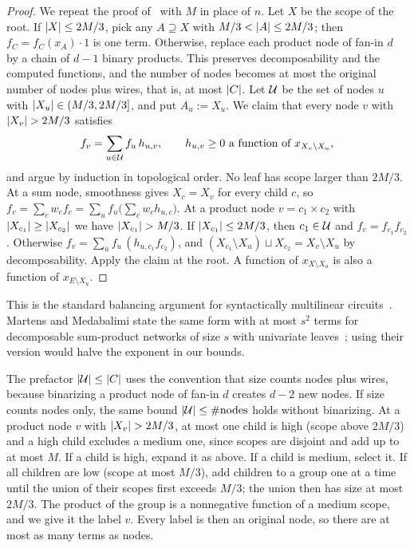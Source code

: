 \begin{proof}
We repeat the proof of~\cite{Blaschke26Dimers} with $M$ in place of $n$. Let $X$ be the scope of the root. If $\lvert X\rvert\le2M/3$, pick any $A\supseteq X$ with $M/3<\lvert A\rvert\le2M/3$; then $f_C=f_C(x_A)\cdot1$ is one term. Otherwise, replace each product node of fan-in $d$ by a chain of $d-1$ binary products. This preserves decomposability and the computed functions, and the number of nodes becomes at most the original number of nodes plus wires, that is, at most $\lvert C\rvert$. Let $\mathcal{U}$ be the set of nodes $u$ with $\lvert X_u\rvert\in(M/3,2M/3]$, and put $A_u:=X_u$. We claim that every node $v$ with $\lvert X_v\rvert>2M/3$ satisfies
\[
  f_v=\sum_{u\in\mathcal{U}}f_u\,h_{u,v},\qquad h_{u,v}\ge0\ \text{a function of }x_{X_v\setminus X_u},
\]
and argue by induction in topological order. No leaf has scope larger than $2M/3$. At a sum node, smoothness gives $X_c=X_v$ for every child $c$, so $f_v=\sum_cw_cf_c=\sum_uf_u\bigl(\sum_cw_ch_{u,c}\bigr)$. At a product node $v=c_1\times c_2$ with $\lvert X_{c_1}\rvert\ge\lvert X_{c_2}\rvert$ we have $\lvert X_{c_1}\rvert>M/3$. If $\lvert X_{c_1}\rvert\le2M/3$, then $c_1\in\mathcal{U}$ and $f_v=f_{c_1}f_{c_2}$. Otherwise $f_v=\sum_uf_u\,(h_{u,c_1}f_{c_2})$, and $(X_{c_1}\setminus X_u)\sqcup X_{c_2}=X_v\setminus X_u$ by decomposability. Apply the claim at the root. A function of $x_{X\setminus X_u}$ is also a function of $x_{E\setminus X_u}$.
\end{proof}

This is the standard balancing argument for syntactically multilinear circuits~\cite{RazYehudayoff08}. Martens and Medabalimi state the same form with at most $s^2$ terms for decomposable sum-product networks of size $s$ with univariate leaves~\cite[Thm.~38]{MartensMedabalimi14}; using their version would halve the exponent in our bounds.

\begin{remark}\label{rem:nodes}
The prefactor $\lvert \mathcal{U}\rvert\le\lvert C\rvert$ uses the convention that size counts nodes plus wires, because binarizing a product node of fan-in $d$ creates $d-2$ new nodes. If size counts nodes only, the same bound $\lvert \mathcal{U}\rvert\le\#\text{nodes}$ holds without binarizing. At a product node $v$ with $\lvert X_v\rvert>2M/3$, at most one child is high (scope above $2M/3$) and a high child excludes a medium one, since scopes are disjoint and add up to at most $M$. If a child is high, expand it as above. If a child is medium, select it. If all children are low (scope at most $M/3$), add children to a group one at a time until the union of their scopes first exceeds $M/3$; the union then has size at most $2M/3$. The product of the group is a nonnegative function of a medium scope, and we give it the label $v$. Every label is then an original node, so there are at most as many terms as nodes.
\end{remark}

